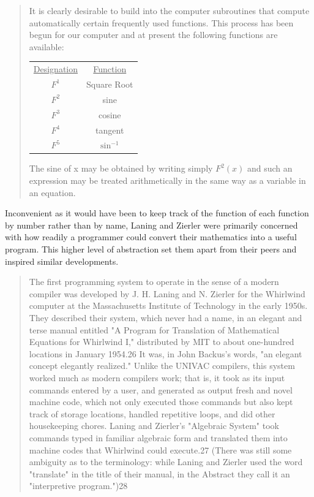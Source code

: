 \begin{quotation}
	It is clearly desirable to build into the computer subroutines
	that compute automatically certain frequently used functions. This
	process has been begun for our computer and at present the following
	functions are available:
	\\
	\begin{center}
		\begin{tabular}{|c|c|}
			\hline
			\underline{Designation} & \underline{Function} \\
			$F^1$                   & Square Root          \\
			$F^2$                   & sine                 \\
			$F^3$                   & cosine               \\
			$F^4$                   & tangent              \\
			$F^5$                   & $\sin^{-1}$          \\
			\hline
		\end{tabular}
	\end{center}

	The sine of x may be obtained by writing simply $F^{2}(x)$ and
	such an expression may be treated arithmetically in the same way
	as a variable in an equation.
\end{quotation}

Inconvenient as it would have been to keep track of the function of each function
by number rather than by name, Laning and Zierler were primarily concerned with
how readily a programmer could convert their mathematics into a useful program.
This higher level of abstraction set them apart from their peers and inspired
similar developments.

\begin{quotation}
	The first programming system to operate in the sense of a modern compiler was
	developed by J. H. Laning and N. Zierler for the Whirlwind computer at the
	Massachusetts Institute of Technology in the early 1950s. They described their
	system, which never had a name, in an elegant and terse manual entitled "A
	Program for Translation of Mathematical Equations for Whirlwind I,"
	distributed
	by MIT to about one-hundred locations in January 1954.26 It was, in John
	Backus's words, "an elegant concept elegantly realized." Unlike the UNIVAC
	compilers, this system worked much as modern compilers work; that is, it took
	as its input commands entered by a user, and generated as output fresh and
	novel machine code, which not only executed those commands but also kept track
	of storage locations, handled repetitive loops, and did other housekeeping
	chores. Laning and Zierler's "Algebraic System" took commands typed
	in familiar
	algebraic form and translated them into machine codes that Whirlwind could
	execute.27 (There was still some ambiguity as to the terminology: while Laning
	and Zierler used the word "translate" in the title of their manual, in the
	Abstract they call it an "interpretive program.")28
	\cite{new-history-of-modern-computing}
\end{quotation}

